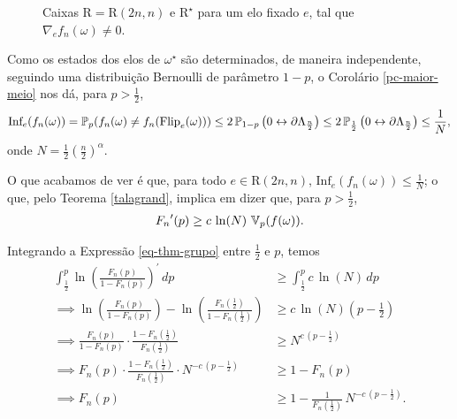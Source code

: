 \begin{figure*}[!htbp]
	\centering
	
	\vspace{-16pt}
	\caption{Caixas $\text{R} = \text{R}(2n, n)$ e $\text{R}^{\star}$ para um elo fixado $e$, tal que $\nabla_{e}f_n(\omega) \neq 0$.}
	\label{caixa-2n}
\end{figure*}

\par Como os estados dos elos de $\omega^{\star}$ são determinados, de maneira independente, seguindo uma distribuição Bernoulli de parâmetro $1 - p$, o Corolário \ref{pc-maior-meio} nos dá, para $p > \frac{1}{2}$, 
\begin{align*}
	\text{Inf}_{e}(f_n(\omega)) = \operatorname{\mathbb{P}}_p(f_n(\omega) \neq f_n(\text{Flip}_e(\omega))) \leq 2\operatorname{\mathbb{P}}_{1-p}\left(0 \leftrightarrow \partial\Lambda_{\frac{n}{2}}\right) \leq 2\operatorname{\mathbb{P}}_{\frac{1}{2}}\left(0 \leftrightarrow \partial\Lambda_{\frac{n}{2}}\right) \leq \frac{1}{N},
\end{align*}
onde $N = \frac{1}{2}\left(\frac{n}{2}\right)^{\alpha}$.

\par O que acabamos de ver é que, para todo $e \in \text{R}(2n ,n)$, $\text{Inf}_{e}(f_n(\omega)) \leq \frac{1}{N}$; o que, pelo Teorema \ref{talagrand}, implica em dizer que, para $p > \frac{1}{2}$,
\begin{align}\label{eq-thm-grupo}
	{F_n}^{\prime}(p) \geq c\,\ln(N)\,\operatorname{\mathbb{V}}_p(f(\omega)).
\end{align}

\par Integrando a Expressão \eqref{eq-thm-grupo} entre $\frac{1}{2}$ e $p$, temos
\begin{align*}
	\int_{\frac{1}{2}}^{p}\ln\left(\frac{F_n(p)}{1-F_n(p)}\right)^{\prime} \, dp &\geq \int_{\frac{1}{2}}^{p} c \, \ln(N) \, dp \\
	\implies \ln\left(\frac{F_n(p)}{1 - F_n(p)}\right) - \ln\left(\frac{F_n\left(\frac{1}{2}\right)}{1 - F_n\left(\frac{1}{2}\right)}\right) &\geq c \, \ln(N) \left(p - \frac{1}{2}\right) \\
	\implies \frac{F_n(p)}{1-F_n(p)} \cdot \frac{1 - F_n\left(\frac{1}{2}\right)}{F_n\left(\frac{1}{2}\right)} &\geq N^{c\,\left(p-\frac{1}{2}\right)} \\
	\implies F_n(p) \cdot \frac{1 - F_n\left(\frac{1}{2}\right)}{F_n\left(\frac{1}{2}\right)} \cdot N^{-c\,\left(p - \frac{1}{2}\right)} &\geq 1 - F_n(p) \\
	\implies F_n(p) &\geq 1 - \frac{1}{F_n\left(\frac{1}{2}\right)} \, N^{-c\,\left(p - \frac{1}{2}\right)}.
\end{align*}

